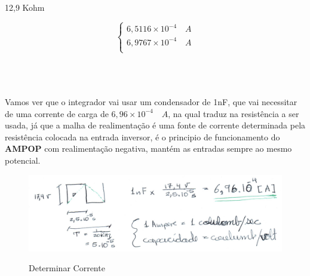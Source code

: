 \documentclass[titlepage, a4paper, 10pt, reqno, openany]{report}
\begin{document}
\hspace{3cm} 12,9 Kohm \hspace{3cm}
\begin{minipage}[l]{0pt}
	$$\left\lbrace\begin{array}{c}
		6,5116 \times 10^{-4} \quad A \\
		6,9767 \times 10^{-4} \quad A \\
	\end{array}\right.$$
\end{minipage}\\
\\
\\
Vamos ver que o integrador vai usar um condensador de 1nF, que vai necessitar de uma corrente de carga de $6,96 \times 10^{-4} \quad A$, na qual traduz na resistência a ser usada, já que a malha de realimentação é uma fonte de corrente determinada pela resistência colocada na entrada inversor, é o principio de funcionamento do {\bf AMPOP} com realimentação negativa, mantém as entradas sempre ao mesmo potencial.
\begin{figure}[H]
	\includegraphics[scale=0.9]{./image/trb3calc_1.jpg}\\
	\caption{Determinar Corrente}
\end{figure}
\end{document}
